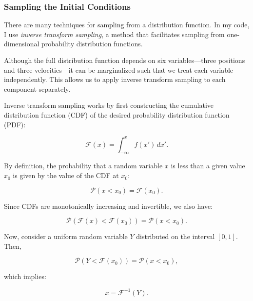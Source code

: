         \subsubsection{Sampling the Initial Conditions}

            There are many techniques for sampling from a distribution function. In my code, I use \textit{inverse transform sampling}, a method that facilitates sampling from one-dimensional probability distribution functions.

            Although the full distribution function depends on six variables—three positions and three velocities—it can be marginalized such that we treat each variable independently. This allows us to apply inverse transform sampling to each component separately.

            Inverse transform sampling works by first constructing the cumulative distribution function (CDF) of the desired probability distribution function (PDF):

            \begin{equation}
                \mathcal{F}(x) = \int_{-\infty}^{x} f(x')\,dx'.
            \end{equation}

            By definition, the probability that a random variable $x$ is less than a given value $x_0$ is given by the value of the CDF at $x_0$:

            \begin{equation}
                \mathcal{P}(x < x_0) = \mathcal{F}(x_0).
            \end{equation}

            Since CDFs are monotonically increasing and invertible, we also have:

            \begin{equation}
                \mathcal{P}(\mathcal{F}(x) < \mathcal{F}(x_0)) = \mathcal{P}(x < x_0).
            \end{equation}

            Now, consider a uniform random variable $Y$ distributed on the interval $[0,1]$. Then,

            \begin{equation}
                \mathcal{P}(Y < \mathcal{F}(x_0)) = \mathcal{P}(x < x_0),
            \end{equation}

            which implies:

            \begin{equation}
                x = \mathcal{F}^{-1}(Y).
            \end{equation}

